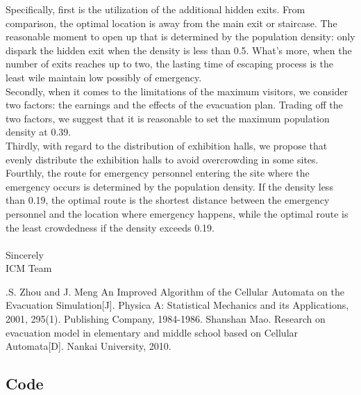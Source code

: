 \documentclass{mcmthesis}
\begin{document}
\indent Specifically, first is the utilization of the additional hidden exits. From comparison, the optimal location is away from the main exit or staircase. The reasonable moment to open up that is determined by the population density: only dispark the hidden exit when the density is less than 0.5. What's more, when the number of exits reaches up to two, the lasting time of escaping process is the least wile maintain low possibly of emergency. \\
\indent Secondly, when it comes to the limitations of the maximum visitors, we consider two factors: the earnings and the effects of the evacuation plan. Trading off the two factors, we suggest that it is reasonable to set the maximum population density at 0.39. \\
\indent Thirdly, with regard to the distribution of exhibition halls, we propose that evenly distribute the exhibition halls to avoid overcrowding in some sites. \\
\indent Fourthly, the route for emergency personnel entering the site where the emergency occurs is determined by the population density. If the density less than 0.19, the optimal route is the shortest distance between the emergency personnel and the location where emergency happens, while the optimal route is the least crowdedness if the density exceeds 0.19.\\\\

Sincerely\\
\quad ICM Team\\
\clearpage

\begin{thebibliography}{99}
.S. Zhou and J. Meng An Improved Algorithm of the Cellular Automata on the Evacuation Simulation[J]. Physica A:  Statistical Mechanics and its Applications, 2001, 295(1). Publishing Company, 1984-1986.
Shanshan Mao. Research on evacuation model in elementary and middle school based on Cellular Automata[D]. Nankai University, 2010.
\end{thebibliography}

\begin{appendices}
	\section{Code}
	
	
	
	
	
	
	
	
\end{appendices}
\end{document}
